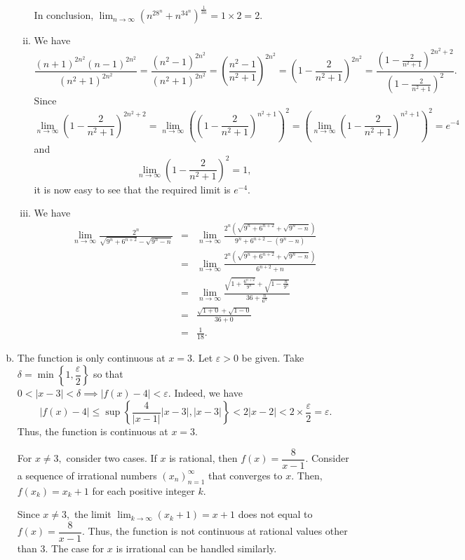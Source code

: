 \documentclass{article}
\begin{document}
\begin{enumerate}[(a)]
\begin{enumerate}[(i)]
        In conclusion, $\displaystyle\lim_{n\to\infty}(n^28^n+n^34^n)^{\frac{1}{3n}}=1\times2=2.$
        \item We have
        $$\frac{(n+1)^{2n^2}(n-1)^{2n^2}}{(n^2+1)^{2n^2}}=\frac{(n^2-1)^{2n^2}}{(n^2+1)^{2n^2}}=\left(\frac{n^2-1}{n^2+1}\right)^{2n^2}
        =\left(1-\frac{2}{n^2+1}\right)^{2n^2}
        =\frac{\left(1-\frac{2}{n^2+1}\right)^{2n^2+2}}{\left(1-\frac{2}{n^2+1}\right)^{2}}.$$
        Since $$\lim_{n\to\infty}\left(1-\frac{2}{n^2+1}\right)^{2n^2+2}=\lim_{n\to\infty}\left(\left(1-\frac{2}{n^2+1}\right)^{n^2+1}\right)^2=\left(\lim_{n\to\infty}\left(1-\frac{2}{n^2+1}\right)^{n^2+1}\right)^2=e^{-4}$$ and $$\lim_{n\to\infty}\left(1-\frac{2}{n^2+1}\right)^{2}=1,$$
        it is now easy to see that the required limit is $e^{-4}.$
        \item We have \begin{eqnarray*}\lim_{n\to\infty}\frac{2^n}{\sqrt{9^n+6^{n+2}}-\sqrt{9^n-n}}&=&\lim_{n\to\infty}\frac{2^n\left(\sqrt{9^n+6^{n+2}}+\sqrt{9^n-n}\right)}{9^n+6^{n+2}-(9^n-n)}\\
        &=&\lim_{n\to\infty}\frac{2^n\left(\sqrt{9^n+6^{n+2}}+\sqrt{9^n-n}\right)}{6^{n+2}+n}\\
        &=&\lim_{n\to\infty}\frac{\sqrt{1+\frac{6^{n+2}}{9^n}}+\sqrt{1-\frac{n}{9^n}}}{36+\frac{n}{6^n}}\\
        &=&\frac{\sqrt{1+0}+\sqrt{1-0}}{36+0}\\
        &=&\frac{1}{18}.
        \end{eqnarray*}
    \end{enumerate}
    \item The function is only continuous at $x=3.$ Let $\varepsilon>0$ be given. Take $\delta=\min\left\{1,\dfrac{\varepsilon}{2}\right\}$ so that\\ $0<|x-3|<\delta\implies |f(x)-4|<\varepsilon.$ Indeed, we have $$ |f(x)-4|\leq \sup\left\{\frac{4}{|x-1|}|x-3|,|x-3|\right\}<2|x-2|<2\times\frac{\varepsilon}{2}=\varepsilon.$$ Thus, the function is continuous at $x=3.$
    
    For $x\neq3,$ consider two cases. If $x$ is rational, then $f(x)=\dfrac{8}{x-1}.$ Consider a sequence of irrational numbers $(x_n)^{\infty}_{n=1}$ that converges to $x.$ Then, $f(x_k)=x_k+1$ for each positive integer $k.$ 
    
    Since $x\neq 3,$ the limit $\displaystyle\lim_{k\to\infty}(x_k+1)=x+1$ does not equal to $f(x)=\dfrac{8}{x-1}.$ Thus, the function is not continuous at rational values other than 3. The case for $x$ is irrational can be handled similarly.
\end{enumerate}
\end{document}
